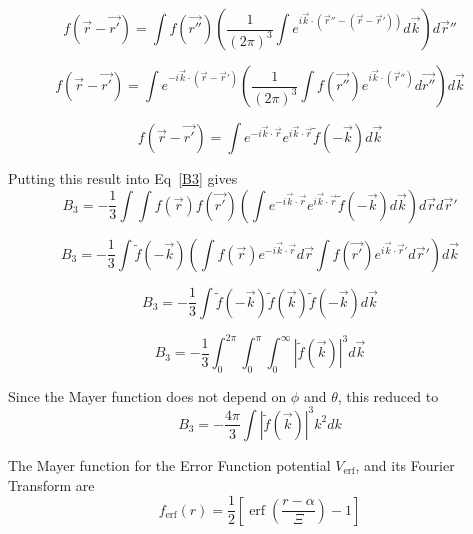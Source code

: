 \documentclass[double,12pt]{beavtex}
\begin{document}
\begin{equation}f(\vec{r}-\vec{r'})=\int{f(\vec{r''})\left( \frac{1}{\left(2\pi\right)^3}\int e^{i\vec k\cdot (\vec{r}''-(\vec r-\vec r'))}d\vec{k} \right) d\vec r''} \end{equation}

\begin{equation}f(\vec{r}-\vec{r'})=\int{ e^{-i\vec k\cdot (\vec r-\vec r')}\left(\frac{1}{\left(2\pi\right)^3}\int{f(\vec{r''}) e^{i\vec k\cdot (\vec{r}'')}d\vec{r''}} \right) d\vec k} \end{equation}

\begin{equation}f(\vec{r}-\vec{r'})=\int{ e^{-i\vec k\cdot \vec r}e^{i\vec k\cdot \vec r}\widetilde{f}(-\vec k) d\vec k} \end{equation}

Putting this result into Eq~\ref{B3} gives
\begin{equation}B_3=-\frac{1}{3}\int{\int{f(\vec{r})f(\vec{r'})\left(\int{ e^{-i\vec k\cdot \vec r}e^{i\vec k\cdot \vec r}\widetilde{f}(-\vec k) d\vec k}\right)d\vec rd\vec r'}}\end{equation}

\begin{equation}B_3=-\frac{1}{3}\int{\widetilde{f}(-\vec k)\left(\int{f(\vec{r})e^{-i\vec k\cdot \vec r}}d\vec r\int{f(\vec{r'})e^{i\vec k\cdot \vec r'} d\vec r'}\right)d\vec k}\end{equation}

\begin{equation}B_3=-\frac{1}{3}\int{\widetilde{f}(-\vec k)\widetilde{f}(\vec k)\widetilde{f}(-\vec k)d\vec k}\end{equation}

\begin{equation}B_3=-\frac{1}{3}\int_0^{2\pi}\int_0^{\pi}\int_0^{\infty}{|\widetilde{f}(\vec k)|^3d\vec k}\end{equation}

Since the Mayer function does not depend on $\phi$ and $\theta$, this reduced to
\begin{equation}B_3=-\frac{4\pi}{3}\int{|\widetilde{f}(\vec k)|^3k^2dk}\end{equation}

The Mayer function for the Error Function potential $V_{\operatorname{erf}}$, and its Fourier Transform are
\begin{equation}f_{\operatorname{erf}}(r)=\frac{1}{2}\left[\operatorname{erf}\left(\frac{r-\alpha}{\Xi}\right)-1\right]\end{equation} 
\end{document}
